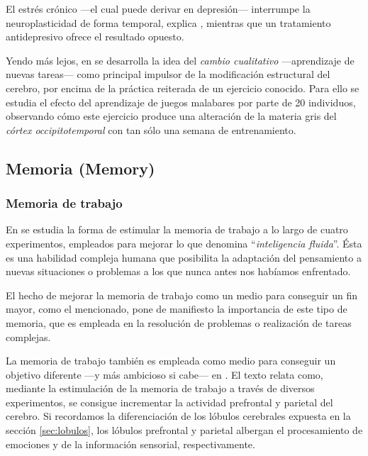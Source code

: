 El estrés crónico ---el cual puede derivar en depresión--- interrumpe la neuroplasticidad de forma temporal, explica \cite{Pittenger2008}, mientras que un tratamiento antidepresivo ofrece el resultado opuesto.

Yendo más lejos, en \cite{May2008} se desarrolla la idea del {\it cambio cualitativo} ---aprendizaje de nuevas tareas--- como principal impulsor de la modificación estructural del cerebro, por encima de la práctica reiterada de un ejercicio conocido. Para ello se estudia el efecto del aprendizaje de juegos malabares por parte de 20 individuos, observando cómo este ejercicio produce una alteración de la materia gris del {\it córtex occipitotemporal} con tan sólo una semana de entrenamiento.

\subsection{Memoria (Memory)}

\subsubsection{Memoria de trabajo}
\label{sec::memoria-trabajo}
En \cite{Jaeggi2008} se estudia la forma de estimular la memoria de trabajo a lo largo de cuatro experimentos, empleados para mejorar lo que denomina ``{\it inteligencia fluida}''. Ésta es una habilidad compleja humana que posibilita la adaptación del pensamiento a nuevas situaciones o problemas a los que nunca antes nos habíamos enfrentado.

El hecho de mejorar la memoria de trabajo como un medio para conseguir un fin mayor, como el mencionado, pone de manifiesto la importancia de este tipo de memoria, que es empleada en la resolución de problemas o realización de tareas complejas.

La memoria de trabajo también es empleada como medio para conseguir un objetivo diferente ---y más ambicioso si cabe--- en \cite{Olesen2004}. El texto relata como, mediante la estimulación de la memoria de trabajo a través de diversos experimentos, se consigue incrementar la actividad prefrontal y parietal del cerebro. Si recordamos la diferenciación de los lóbulos cerebrales expuesta en la sección \ref{sec:lobulos}, los lóbulos prefrontal y parietal albergan el procesamiento de emociones y de la información sensorial, respectivamente.

